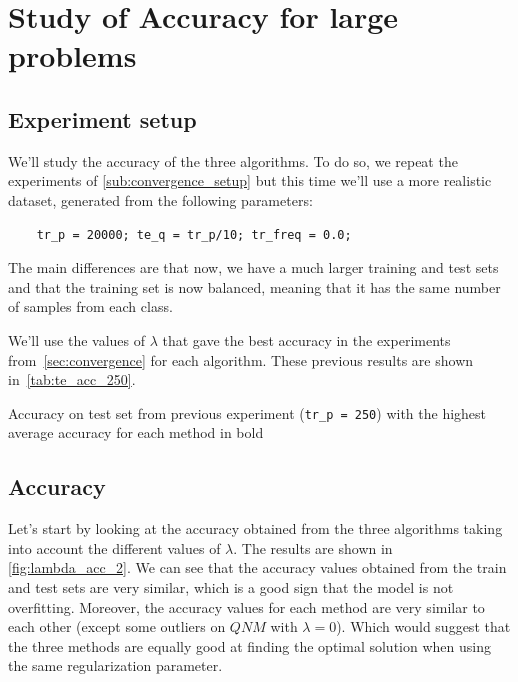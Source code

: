 
\section[Study of Accuracy]{Study of Accuracy for large problems}

\subsection{Experiment setup}

We'll study the accuracy of the three algorithms. To do so, we
repeat the experiments of \cref{sub:convergence_setup} but this time
we'll use a more realistic dataset, generated from the following
parameters:
\begin{center}
    \begin{BVerbatim}
    tr_p = 20000; te_q = tr_p/10; tr_freq = 0.0;
    \end{BVerbatim}
\end{center}

The main differences are that now, we have a much larger training and test
sets and that the training set is now balanced, meaning that it has the same
number of samples from each class.

We'll use the values of $\lambda$ that gave the best accuracy in
the experiments from~\cref{sec:convergence} for each algorithm.
These previous results are shown in~\cref{tab:te_acc_250}.

\begin{table}[ht]
    \caption{Accuracy on test set from previous experiment (\texttt{tr\_p = 250}) with
    the highest average accuracy for each method in bold}%
    \label{tab:te_acc_250}%
    
\end{table}

\pagebreak


\subsection{Accuracy}

Let's start by looking at the accuracy obtained from the three algorithms
taking into account the different values of $\lambda$. The results are shown in
\cref{fig:lambda_acc_2}. We can see that the accuracy values obtained from the
train and test sets are very similar, which is a good sign that the model is
not overfitting. Moreover, the accuracy values for each method are very similar
to each other (except some outliers on $QNM$ with $\lambda = 0$). Which would
suggest that the three methods are equally good at finding the optimal solution
when using the same regularization parameter.

